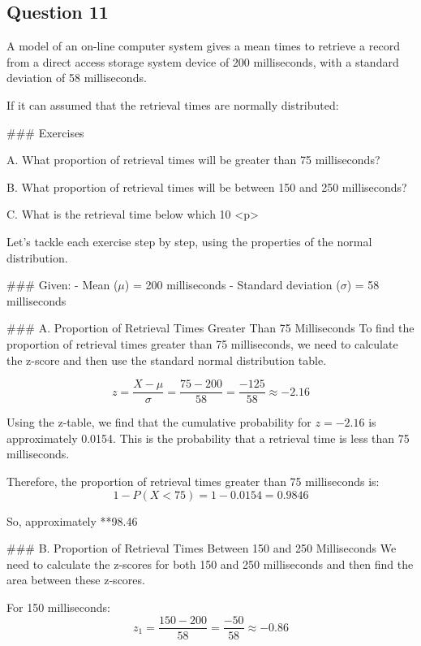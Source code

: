 

\subsection*{Question 11}

A model of an on-line computer system gives a mean times to retrieve a record from a direct access storage system device of 200 milliseconds, with a standard deviation of 58 milliseconds. 

If it can assumed that the retrieval times are normally distributed:

### Exercises 

A. What proportion of retrieval times will be greater than 75 milliseconds?

B. What proportion of retrieval times will be between 150 and 250 milliseconds?

C. What is the retrieval time below which 10%
<p>


	
Let's tackle each exercise step by step, using the properties of the normal distribution.

### Given:
- Mean ($\mu$) = 200 milliseconds
- Standard deviation ($\sigma$) = 58 milliseconds

### A. Proportion of Retrieval Times Greater Than 75 Milliseconds
To find the proportion of retrieval times greater than 75 milliseconds, we need to calculate the z-score and then use the standard normal distribution table.

$$z = \frac{X - \mu}{\sigma} = \frac{75 - 200}{58} = \frac{-125}{58} \approx -2.16$$

Using the z-table, we find that the cumulative probability for $ z = -2.16 $ is approximately 0.0154. This is the probability that a retrieval time is less than 75 milliseconds.

Therefore, the proportion of retrieval times greater than 75 milliseconds is:
$$1 - P(X < 75) = 1 - 0.0154 = 0.9846$$

So, approximately **98.46%

### B. Proportion of Retrieval Times Between 150 and 250 Milliseconds
We need to calculate the z-scores for both 150 and 250 milliseconds and then find the area between these z-scores.

For 150 milliseconds:
$$z_1 = \frac{150 - 200}{58} = \frac{-50}{58} \approx -0.86$$

